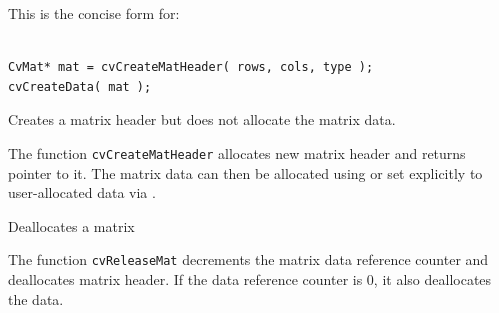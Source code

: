 \begin{description}
\end{description}

This is the concise form for:

\begin{lstlisting}

CvMat* mat = cvCreateMatHeader( rows, cols, type );
cvCreateData( mat );

\end{lstlisting}

\label{CreateMatHeader}

Creates a matrix header but does not allocate the matrix data.


\begin{description}
\end{description}

The function \texttt{cvCreateMatHeader} allocates new matrix header and returns pointer to it. The matrix data can then be allocated using  or set explicitly to user-allocated data via .


\label{ReleaseMat}

Deallocates a matrix


\begin{description}
\end{description}


The function \texttt{cvReleaseMat} decrements the matrix data reference counter and deallocates matrix header. If the data reference counter is 0, it also deallocates the data.

